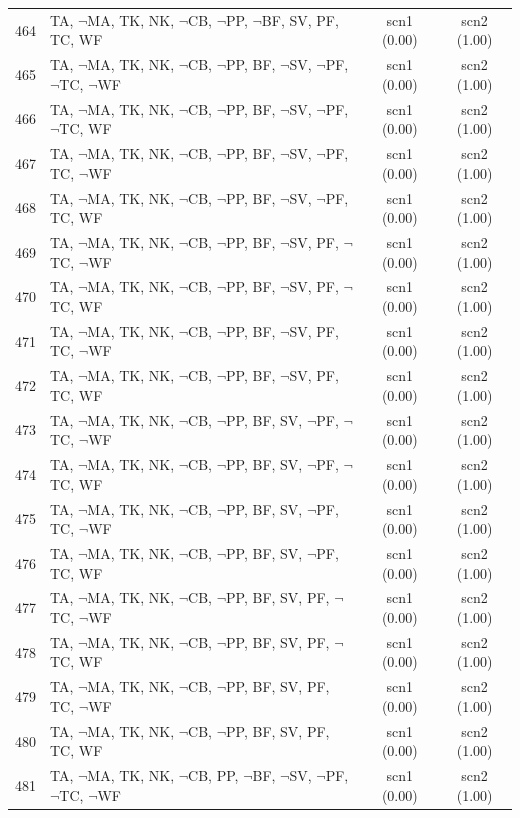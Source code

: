 \documentclass[12pt]{article}
\begin{document}
\begin{longtable}{|l|l|c|c|}
464 & TA, $\neg$MA, TK, NK, $\neg$CB, $\neg$PP, $\neg$BF, SV, PF, TC, WF & scn1 (0.00) & scn2 (1.00)\\
465 & TA, $\neg$MA, TK, NK, $\neg$CB, $\neg$PP, BF, $\neg$SV, $\neg$PF, $\neg$TC, $\neg$WF & scn1 (0.00) & scn2 (1.00)\\
466 & TA, $\neg$MA, TK, NK, $\neg$CB, $\neg$PP, BF, $\neg$SV, $\neg$PF, $\neg$TC, WF & scn1 (0.00) & scn2 (1.00)\\
467 & TA, $\neg$MA, TK, NK, $\neg$CB, $\neg$PP, BF, $\neg$SV, $\neg$PF, TC, $\neg$WF & scn1 (0.00) & scn2 (1.00)\\
468 & TA, $\neg$MA, TK, NK, $\neg$CB, $\neg$PP, BF, $\neg$SV, $\neg$PF, TC, WF & scn1 (0.00) & scn2 (1.00)\\
469 & TA, $\neg$MA, TK, NK, $\neg$CB, $\neg$PP, BF, $\neg$SV, PF, $\neg$TC, $\neg$WF & scn1 (0.00) & scn2 (1.00)\\
470 & TA, $\neg$MA, TK, NK, $\neg$CB, $\neg$PP, BF, $\neg$SV, PF, $\neg$TC, WF & scn1 (0.00) & scn2 (1.00)\\
471 & TA, $\neg$MA, TK, NK, $\neg$CB, $\neg$PP, BF, $\neg$SV, PF, TC, $\neg$WF & scn1 (0.00) & scn2 (1.00)\\
472 & TA, $\neg$MA, TK, NK, $\neg$CB, $\neg$PP, BF, $\neg$SV, PF, TC, WF & scn1 (0.00) & scn2 (1.00)\\
473 & TA, $\neg$MA, TK, NK, $\neg$CB, $\neg$PP, BF, SV, $\neg$PF, $\neg$TC, $\neg$WF & scn1 (0.00) & scn2 (1.00)\\
474 & TA, $\neg$MA, TK, NK, $\neg$CB, $\neg$PP, BF, SV, $\neg$PF, $\neg$TC, WF & scn1 (0.00) & scn2 (1.00)\\
475 & TA, $\neg$MA, TK, NK, $\neg$CB, $\neg$PP, BF, SV, $\neg$PF, TC, $\neg$WF & scn1 (0.00) & scn2 (1.00)\\
476 & TA, $\neg$MA, TK, NK, $\neg$CB, $\neg$PP, BF, SV, $\neg$PF, TC, WF & scn1 (0.00) & scn2 (1.00)\\
477 & TA, $\neg$MA, TK, NK, $\neg$CB, $\neg$PP, BF, SV, PF, $\neg$TC, $\neg$WF & scn1 (0.00) & scn2 (1.00)\\
478 & TA, $\neg$MA, TK, NK, $\neg$CB, $\neg$PP, BF, SV, PF, $\neg$TC, WF & scn1 (0.00) & scn2 (1.00)\\
479 & TA, $\neg$MA, TK, NK, $\neg$CB, $\neg$PP, BF, SV, PF, TC, $\neg$WF & scn1 (0.00) & scn2 (1.00)\\
480 & TA, $\neg$MA, TK, NK, $\neg$CB, $\neg$PP, BF, SV, PF, TC, WF & scn1 (0.00) & scn2 (1.00)\\
481 & TA, $\neg$MA, TK, NK, $\neg$CB, PP, $\neg$BF, $\neg$SV, $\neg$PF, $\neg$TC, $\neg$WF & scn1 (0.00) & scn2 (1.00)\\

\end{longtable}
\end{document}
